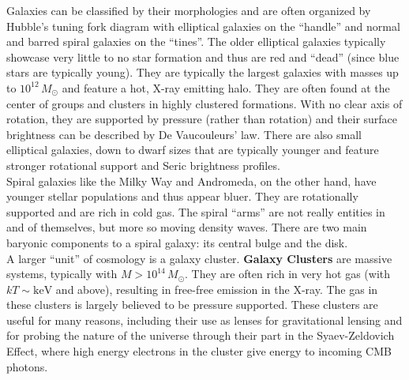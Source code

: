 \documentclass[10pt]{article}
\numberwithin{equation}{section}
\newcommand{\n}{\noindent}
\begin{document}
	\n Galaxies can be classified by their morphologies and are often organized by Hubble's tuning fork diagram with elliptical galaxies on the ``handle'' and normal and barred spiral galaxies on the ``tines''. The older elliptical galaxies typically showcase very little to no star formation and thus are red and ``dead'' (since blue stars are typically young). They are typically the largest galaxies with masses up to $10^{12}\,M_\odot$ and feature a hot, X-ray emitting halo. They are often found at the center of groups and clusters in highly clustered formations. With no clear axis of rotation, they are supported by pressure (rather than rotation) and their surface brightness can be described by De Vaucouleurs' law. There are also small elliptical galaxies, down to dwarf sizes that are typically younger and feature stronger rotational support and Seric brightness profiles.\\
	
	\n Spiral galaxies like the Milky Way and Andromeda, on the other hand, have younger stellar populations and thus appear bluer. They are rotationally supported and are rich in cold gas. The spiral ``arms'' are not really entities in and of themselves, but more so moving density waves. There are two main baryonic components to a spiral galaxy: its central bulge and the disk.\\
	
	\n A larger ``unit'' of cosmology is a galaxy cluster. \textbf{Galaxy Clusters} are massive systems, typically with $M> 10^{14}\,M_\odot$. They are often rich in very hot gas (with $kT\sim \mathrm{keV}$ and above), resulting in free-free emission in the X-ray. The gas in these clusters is largely believed to be pressure supported. These clusters are useful for many reasons, including their use as lenses for gravitational lensing and for probing the nature of the universe through their part in the Syaev-Zeldovich Effect, where high energy electrons in the cluster give energy to incoming CMB photons.
\end{document}
